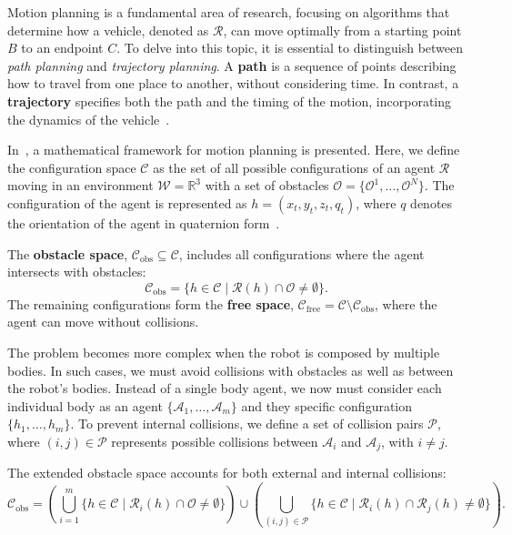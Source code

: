 Motion planning is a fundamental area of research, focusing on algorithms that determine how a vehicle, denoted as $\mathcal{R}$, can move optimally from a starting point $B$ to an endpoint $C$. To delve into this topic, it is essential to distinguish between \textit{path planning} and \textit{trajectory planning}. A \textbf{path} is a sequence of points describing how to travel from one place to another, without considering time. In contrast, a \textbf{trajectory} specifies both the path and the timing of the motion, incorporating the dynamics of the vehicle~\cite{wolek2017model}.

In~\cite{lavalle2006planning}, a mathematical framework for motion planning is presented. Here, we define the configuration space $\mathcal{C}$ as the set of all possible configurations of an agent $\mathcal{R}$ moving in an environment $\mathcal{W} = \mathbb{R}^3$ with a set of obstacles $\mathcal{O} = \{\mathcal{O}^1, \dots, \mathcal{O}^N\}$. The configuration of the agent is represented as $h = (x_t, y_t, z_t, q_t)$, where $q$ denotes the orientation of the agent in quaternion form~\cite{trawny2005indirect}.

The \textbf{obstacle space}, $\mathcal{C}_{\text{obs}} \subseteq \mathcal{C}$, includes all configurations where the agent intersects with obstacles:
\[
\mathcal{C}_{\text{obs}} = \{ h \in \mathcal{C} \mid \mathcal{R}(h) \cap \mathcal{O} \neq \emptyset \}.
\]
The remaining configurations form the \textbf{free space}, $\mathcal{C}_{\text{free}} = \mathcal{C} \setminus \mathcal{C}_{\text{obs}}$, where the agent can move without collisions.

The problem becomes more complex when the robot is composed by multiple bodies. In such cases, we must avoid collisions with obstacles as well as between the robot's bodies. Instead of a single body agent, we now must consider each individual body as an agent $\{\mathcal{A}_1, \dots, \mathcal{A}_m\}$ and they specific configuration  $\{ h_1, \dots, h_m \}$. To prevent internal collisions, we define a set of collision pairs $\mathcal{P}$, where $(i, j) \in \mathcal{P}$ represents possible collisions between $\mathcal{A}_i$ and $\mathcal{A}_j$, with $i \neq j$.

The extended obstacle space accounts for both external and internal collisions:
\[
\mathcal{C}_{\text{obs}} = \left( \bigcup_{i=1}^m \{h \in \mathcal{C} \mid \mathcal{R}_i(h) \cap \mathcal{O} \neq \emptyset\} \right) \cup \left( \bigcup_{(i, j) \in \mathcal{P}} \{h \in \mathcal{C} \mid \mathcal{R}_i(h) \cap \mathcal{R}_j(h) \neq \emptyset\} \right).
\]

